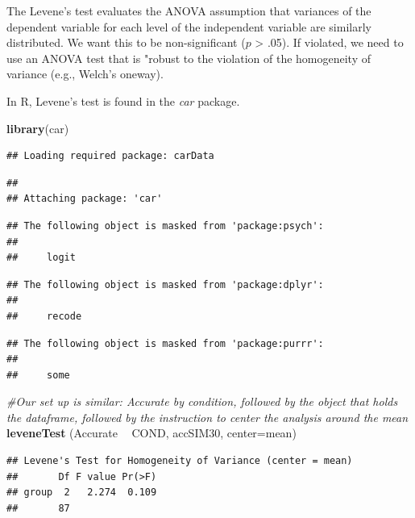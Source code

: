 \documentclass[
  english,
]{book}
\newenvironment{Shaded}{\begin{snugshade}}{\end{snugshade}}
\newcommand{\CommentTok}[1]{\textcolor[rgb]{0.56,0.35,0.01}{\textit{#1}}}
\newcommand{\DataTypeTok}[1]{\textcolor[rgb]{0.13,0.29,0.53}{#1}}
\newcommand{\KeywordTok}[1]{\textcolor[rgb]{0.13,0.29,0.53}{\textbf{#1}}}
\newcommand{\NormalTok}[1]{#1}
\newcommand{\OperatorTok}[1]{\textcolor[rgb]{0.81,0.36,0.00}{\textbf{#1}}}
\newcommand{\StringTok}[1]{\textcolor[rgb]{0.31,0.60,0.02}{#1}}
\begin{document}
The Levene's test evaluates the ANOVA assumption that variances of the dependent variable for each level of the independent variable are similarly distributed. We want this to be non-significant (\(p\) \textgreater{} .05). If violated, we need to use an ANOVA test that is "robust to the violation of the homogeneity of variance (e.g., Welch's oneway).

In R, Levene's test is found in the \emph{car} package.

\begin{Shaded}
\begin{Highlighting}[]
\KeywordTok{library}\NormalTok{(car)}
\end{Highlighting}
\end{Shaded}

\begin{verbatim}
## Loading required package: carData
\end{verbatim}

\begin{verbatim}
## 
## Attaching package: 'car'
\end{verbatim}

\begin{verbatim}
## The following object is masked from 'package:psych':
## 
##     logit
\end{verbatim}

\begin{verbatim}
## The following object is masked from 'package:dplyr':
## 
##     recode
\end{verbatim}

\begin{verbatim}
## The following object is masked from 'package:purrr':
## 
##     some
\end{verbatim}

\begin{Shaded}
\begin{Highlighting}[]
\CommentTok{#Our set up is similar:  Accurate by condition, followed by the object that holds the dataframe, followed by the instruction to center the analysis around the mean}
\KeywordTok{leveneTest}\NormalTok{ (Accurate }\OperatorTok{~}\StringTok{ }\NormalTok{COND, accSIM30, }\DataTypeTok{center=}\NormalTok{mean)}
\end{Highlighting}
\end{Shaded}

\begin{verbatim}
## Levene's Test for Homogeneity of Variance (center = mean)
##       Df F value Pr(>F)
## group  2   2.274  0.109
##       87
\end{verbatim}
\end{document}
